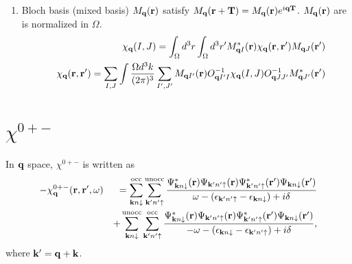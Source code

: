 \documentclass[a4paper,10pt,epsf,fleqn]{article}
\newcommand{\bfq}{{\bf q}}
\newcommand{\bfk}{{\bf k}}
\newcommand{\bfr}{{\bf r}}
\newcommand{\bfT}{{\bf T}}
\newcommand{\ispone}{\downarrow}
\newcommand{\isptwo}{\uparrow}
\begin{document}
\begin{enumerate}
\item Bloch basis (mixed basis) $M_\bfq (\bfr)$ satisfy
$M_\bfq (\bfr + \bfT) = M_\bfq(\bfr) e^{i \bfq \bfT}$.
$M_\bfq (\bfr)$ are is normalized in $\Omega$.
\begin{eqnarray}
&& \chi_\bfq(I,J) = 
\int_\Omega d^3r \int_\Omega d^3r' M^*_{\bfq I} (\bfr) \chi_\bfq(\bfr,\bfr') M_{\bfq J} (\bfr')\\
&&\chi_\bfq(\bfr, \bfr') = 
\sum_{I,J} \int \frac{\Omega d^3 k}{(2 \pi)^3} 
\sum_{I',J'} M_{\bfq I'}(\bfr) O^{-1}_{\bfq I' I}\chi_\bfq(I,J) O^{-1}_{\bfq J J'}  M^*_{\bfq J'}(\bfr')
\end{eqnarray}

\end{enumerate}


\section{$\chi^{0+-}$}
In $\bfq$ space, $\chi^{0+-}$ is written as
\begin{eqnarray}
- \chi^{0+-}_\bfq(\bfr,\bfr',\omega) 
&&=
 \sum^{\rm  occ}_{\bfk n \ispone} \sum^{\rm unocc}_{\bfk' n'\isptwo}
\frac{
\Psi_{\bfk n\ispone}^*(\bfr)      \Psi_{\bfk' n'\isptwo}(\bfr)
\Psi_{\bfk' n'\isptwo}^*(\bfr') \Psi_{\bfk n\ispone}(\bfr') 
}{\omega-(\epsilon_{\bfk' n'\isptwo}-\epsilon_{\bfk n\ispone})+i \delta} \nonumber\\
&&+ \sum^{\rm  unocc}_{\bfk n \ispone} \sum^{\rm occ}_{\bfk' n'\isptwo}
\frac{
\Psi_{\bfk n\ispone}^*(\bfr)      \Psi_{\bfk' n'\isptwo}(\bfr)
\Psi_{\bfk' n'\isptwo}^*(\bfr') \Psi_{\bfk n\ispone}(\bfr') 
}{-\omega-(\epsilon_{\bfk n\ispone}-\epsilon_{\bfk' n'\isptwo})+i \delta},
\label{generalchi01q}
\end{eqnarray}
where $\bfk' = \bfq+ \bfk$. 
\end{document}
